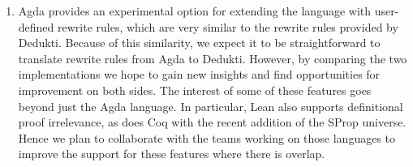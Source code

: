 \begin{enumerate}
\item Agda provides an experimental option for extending the language
with user-defined rewrite rules, which are very similar to the rewrite
rules provided by Dedukti. Because of this similarity, we expect it to
be straightforward to translate rewrite rules from Agda to
Dedukti. However, by comparing the two implementations we hope to gain
new insights and find opportunities for improvement on both sides. The
interest of some of these features goes beyond just the Agda
language. In particular, Lean also supports definitional proof
irrelevance, as does Coq with the recent addition of the SProp
universe. Hence we plan to collaborate with the teams working on those
languages to improve the support for these features where there is
overlap.
\end{enumerate}

